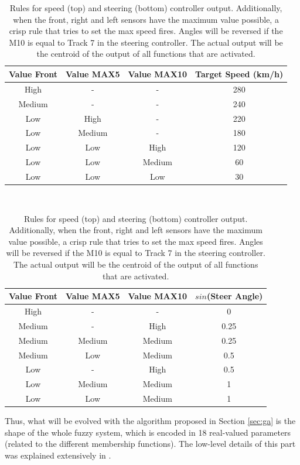 \documentclass[10pt,journal,compsoc]{IEEEtran}
\begin{document}
\begin{table}[h!tb]
  \centering
  {\scriptsize
    \caption{Rules  \cite{salem_evo18} for speed (top) and steering
      (bottom) controller output. Additionally, when 
      the front, right and left sensors have the maximum value
      possible, a crisp rule that tries to set the max speed
      fires.  Angles will be reversed
      if the M10 is equal to Track 7 in the steering controller. The
      actual output will be the centroid of the output of all functions
      that are activated. \label{tab:output}}
    \begin{tabular}{|c|c|c||c|}
\hline
      Value Front & Value MAX5 & Value MAX10 & Target Speed (km/h) \\
      \hline
      High & - & - & 280 \\
      Medium & - & - & 240 \\
      Low & High & - & 220 \\
      Low & Medium & - & 180 \\
      Low & Low & High & 120 \\
      Low & Low & Medium & 60 \\           
      Low & Low & Low & 30 \\     
\hline
\end{tabular}
\vspace{1em} \\
\begin{tabular}{|c|c|c||c|}
\hline
      Value Front & Value MAX5 & Value MAX10 & $sin$(Steer Angle) \\
\hline
      High & - & - & 0 \\
      Medium & - & High & 0.25 \\
      Medium & Medium & Medium & 0.25 \\
      Medium & Low & Medium & 0.5 \\
      Low & - & High & 0.5 \\
      Low & Medium & Medium & 1 \\
      Low & Low & Medium & 1 \\ 
      
\hline
\end{tabular}
}
\end{table}



Thus, what will be evolved with the algorithm proposed in Section
\ref{sec:ga} is the shape of the whole fuzzy system, which is encoded
in 18 real-valued parameters (related to the different membership
functions). The low-level details of this part was explained
extensively in \cite{DBLP:conf/cig/SalemMG19}. 
\end{document}
